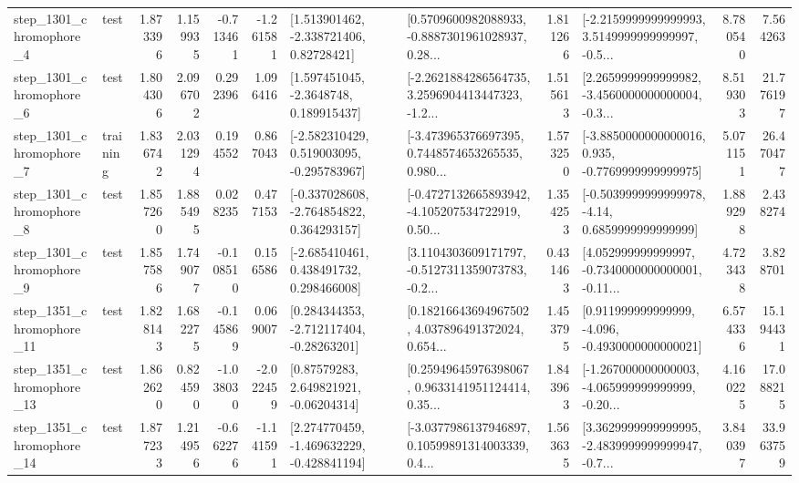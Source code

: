 \begin{tabular}{llrrrrllrlrr}
  step\_1301\_chromophore\_4 &      test &      1.873396 &    1.159935 &     -0.713461 & -1.261581 &     [1.513901462, -2.338721406, 0.82728421] &  [0.5709600982088933, -0.8887301961028937, 0.28... &       1.811266 &  [-2.2159999999999993, 3.5149999999999997, -0.5... &            8.780540 &          7.564263 \\
  step\_1301\_chromophore\_6 &      test &      1.804306 &    2.096702 &      0.292396 &  1.096416 &      [1.597451045, -2.3648748, 0.189915437] &  [-2.2621884286564735, 3.2596904413447323, -1.2... &       1.515613 &  [2.2659999999999982, -3.4560000000000004, -0.3... &            8.519303 &         21.776197 \\
  step\_1301\_chromophore\_7 &  training &      1.836742 &    2.031294 &      0.194552 &  0.867043 &   [-2.582310429, 0.519003095, -0.295783967] &  [-3.473965376697395, 0.7448574653265535, 0.980... &       1.573250 &  [-3.8850000000000016, 0.935, -0.7769999999999975] &            5.071151 &         26.470477 \\
  step\_1301\_chromophore\_8 &      test &      1.857260 &    1.885495 &      0.028235 &  0.477153 &   [-0.337028608, -2.764854822, 0.364293157] &  [-0.4727132665893942, -4.105207534722919, 0.50... &       1.354253 &   [-0.5039999999999978, -4.14, 0.6859999999999999] &            1.889298 &          2.438274 \\
  step\_1301\_chromophore\_9 &      test &      1.857586 &    1.749077 &     -0.108510 &  0.156586 &    [-2.685410461, 0.438491732, 0.298466008] &  [3.1104303609171797, -0.5127311359073783, -0.2... &       0.431463 &  [4.052999999999997, -0.7340000000000001, -0.11... &            4.723438 &          3.828701 \\
 step\_1351\_chromophore\_11 &      test &      1.828143 &    1.682275 &     -0.145869 &  0.069007 &    [0.284344353, -2.712117404, -0.28263201] &  [0.18216643694967502, 4.037896491372024, 0.654... &       1.453795 &   [0.911999999999999, -4.096, -0.4930000000000021] &            6.574336 &         15.194431 \\
 step\_1351\_chromophore\_13 &      test &      1.862620 &    0.824590 &     -1.038030 & -2.022459 &      [0.87579283, 2.649821921, -0.06204314] &  [0.25949645976398067, 0.9633141951124414, 0.35... &       1.843963 &  [-1.267000000000003, -4.065999999999999, -0.20... &            4.160225 &         17.088215 \\
 step\_1351\_chromophore\_14 &      test &      1.877233 &    1.214956 &     -0.662276 & -1.141591 &   [2.274770459, -1.469632229, -0.428841194] &  [-3.0377986137946897, 0.10599891314003339, 0.4... &       1.563635 &  [3.3629999999999995, -2.4839999999999947, -0.7... &            3.840397 &         33.963759 \\

\end{tabular}

